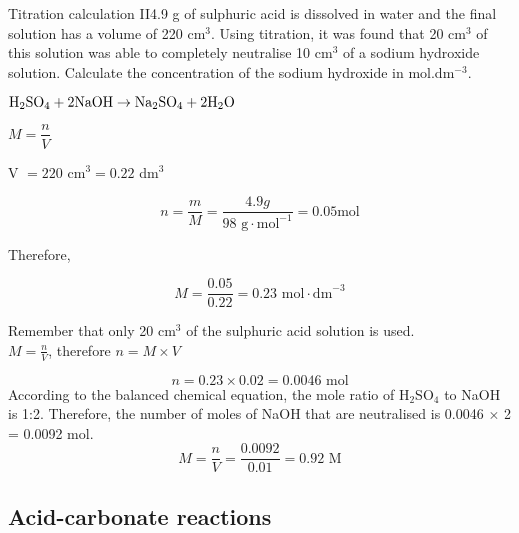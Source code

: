 \begin{wex}{Titration calculation II}{4.9 g of sulphuric acid is dissolved in water and the final solution has a volume of 220 cm$^{3}$. Using titration, it was found that 20 cm$^{3}$ of this solution was able to completely neutralise 10 cm$^{3}$ of a sodium hydroxide solution. Calculate the concentration of the sodium hydroxide in mol.dm$^{-3}$.}{

$\rm{H_{2}SO_{4} + 2NaOH \rightarrow Na_{2}SO_{4} + 2H_{2}O}$

$M = \dfrac{n}{V}$

V $= 220$ cm$^{3} = 0.22$ dm$^{3}$

\begin{equation*}
n = \dfrac{m}{M} = \frac{4.9 g}{98 \text{ g} \cdot \text{mol}^{-1}} = 0.05 \text{mol}
\end{equation*}

Therefore,

\begin{equation*}
M = \dfrac{0.05}{0.22} = 0.23 \text{ mol} \cdot \text{dm}^{-3}
\end{equation*}

Remember that only 20 cm$^{3}$ of the sulphuric acid solution is used.\\

$M = \frac{n}{V}$, therefore $n = M \times V$

\begin{equation*}
n = 0.23 \times 0.02 = 0.0046 \text{ mol}
\end{equation*}
According to the balanced chemical equation, the mole ratio of H$_{2}$SO$_{4}$ to NaOH is 1:2. Therefore, the number of moles of NaOH that are neutralised is 0.0046 $\times$ 2 = 0.0092 mol.
\begin{equation*}
M = \frac{n}{V} = \frac{0.0092}{0.01} = 0.92 \text{ M}
\end{equation*}
}
\end{wex}

\subsection{Acid-carbonate reactions}


